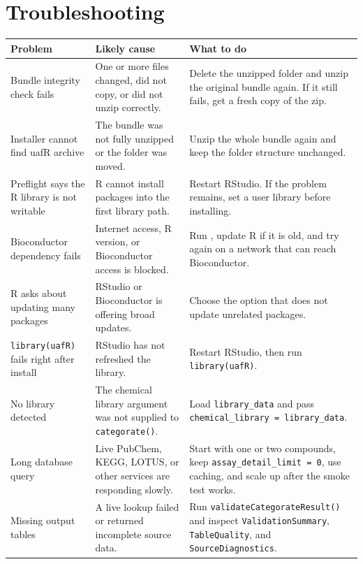 \section{Troubleshooting}
\begin{tabularx}{\textwidth}{p{}p{}Y}
\toprule
\textbf{Problem} & \textbf{Likely cause} & \textbf{What to do}\\
\midrule
Bundle integrity check fails & One or more files changed, did not copy, or did not unzip correctly. & Delete the unzipped folder and unzip the original bundle again. If it still fails, get a fresh copy of the zip.\\
Installer cannot find uafR archive & The bundle was not fully unzipped or the  folder was moved. & Unzip the whole bundle again and keep the folder structure unchanged.\\
Preflight says the R library is not writable & R cannot install packages into the first library path. & Restart RStudio. If the problem remains, set a user library before installing.\\
Bioconductor dependency fails & Internet access, R version, or Bioconductor access is blocked. & Run , update R if it is old, and try again on a network that can reach Bioconductor.\\
R asks about updating many packages & RStudio or Bioconductor is offering broad updates. & Choose the option that does not update unrelated packages.\\
\texttt{library(uafR)} fails right after install & RStudio has not refreshed the library. & Restart RStudio, then run \texttt{library(uafR)}.\\
No library detected & The chemical library argument was not supplied to \texttt{categorate()}. & Load \texttt{library\_data} and pass \texttt{chemical\_library = library\_data}.\\
Long database query & Live PubChem, KEGG, LOTUS, or other services are responding slowly. & Start with one or two compounds, keep \texttt{assay\_detail\_limit = 0}, use caching, and scale up after the smoke test works.\\
Missing output tables & A live lookup failed or returned incomplete source data. & Run \texttt{validateCategorateResult()} and inspect \texttt{ValidationSummary}, \texttt{TableQuality}, and \texttt{SourceDiagnostics}.\\
\bottomrule
\end{tabularx}
